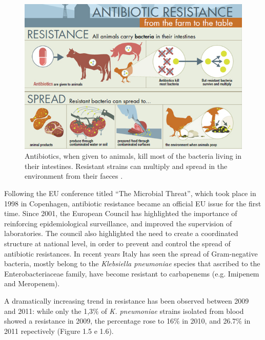 \documentclass[11pt]{report}
\begin{document}
\begin{figure}[htp]
\centering
\includegraphics[scale=0.57]{immagini gamalero/Agricultural_Spread.jpg}
\caption{Antibiotics, when given to animals, kill most of the bacteria living in their intestines. Resistant strains can multiply and spread in the environment from their faeces \cite{CDC_AntibioticResistance}.}
\label{}
\end{figure}

\clearpage
Following the EU conference titled “The Microbial Threat”, which took place in 1998 in Copenhagen, antibiotic resistance became an official EU issue for the first time.
Since 2001, the European Council has highlighted the importance of reinforcing epidemiological surveillance, and improved the supervision of laboratories. The council also highlighted the need to create a coordinated structure at national level, in order to prevent and control the spread of antibiotic resistances.
In recent years Italy has seen the spread of Gram-negative bacteria, mostly belong to the \emph{Klebsiella pneumoniae} species that ascribed to the Enterobacteriaceae family, have become resistant to carbapenems (e.g. Imipenem and Meropenem).

A dramatically increasing trend in resistance has been observed between 2009 and 2011: while only the 1,3$\%$ of \emph{K. pneumoniae} strains isolated from blood showed a resistance in 2009, the percentage rose to 16$\%$ in 2010, and 26.7$\%$ in 2011 repectively (Figure 1.5 e 1.6).
\end{document}
